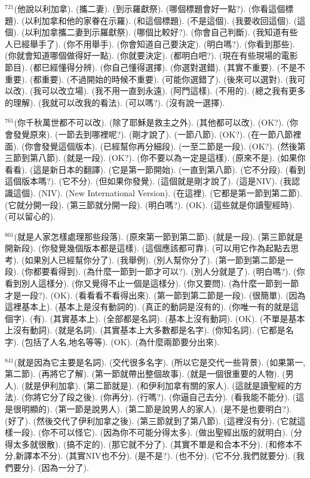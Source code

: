 \documentclass{book}
\begin{document}
$^{721}$(他說以利加拿).
(攜二妻).
(到示羅獻祭).
(哪個標題會好一點?).
(你看這個標題).
(以利加拿和他的家眷在示羅).
(和這個標題).
(不是這個).
(我要收回這個).
(這個).
(以利加拿攜二妻到示羅獻祭).
(哪個比較好?).
(你會自己判斷).
(我知道有些人已經舉手了).
(你不用舉手).
(你會知道自己要決定).
(明白嗎?).
(你看到那些).
(你就會知道哪個做得好一點).
(你就要決定).
(都明白吧?).
(現在有些現場的電影節目).
(都已經懂得分辨).
(你自己懂得選擇).
(你選對選錯).
(其實不重要).
(不是不重要).
(都重要).
(不過開始的時候不重要).
(可能你選錯了).
(後來可以選對).
(我可以改).
(我可以改立場).
(我不用一直到永遠).
(阿門這樣).
(不用的).
(總之我有更多的理解).
(我就可以改我的看法).
(可以嗎?).
(沒有說一選擇).

$^{761}$(你千秋萬世都不可以改).
(除了耶穌是救主之外).
(其他都可以改).
(OK?).
(你會發覺原來).
(一節去到哪裡呢?).
(剛才說了).
(一節八節).
(OK?).
(在一節八節裡面).
(你會發覺這個版本).
(已經幫你再分細段).
(一至二節是一段).
(OK?).
(然後第三節到第八節).
(就是一段).
(OK?).
(你不要以為一定是這樣).
(原來不是).
(如果你看看).
(這是新日本的翻譯).
(它是第一節開始).
(一直到第八節).
(它不分段).
(看到這個版本嗎?).
(它不分).
(但如果你發覺).
(這個就是剛才說了).
(這是NIV).
(我認識這個).
(NIV).
(New International Version).
(在這裡).
(它都是第一節到第二節).
(它就分開一段).
(第三節就分開一段).
(明白嗎?).
(OK).
(這些就是你讀聖經時).
(可以留心的).

$^{801}$(就是人家怎樣處理那些段落).
(原來第一節到第二節).
(就是一段).
(第三節就是開新段).
(你發覺幾個版本都是這樣).
(這個應該都可靠).
(可以用它作為起點去思考).
(如果別人已經幫你分了).
(我舉例).
(別人幫你分了).
(第一節到第二節是一段).
(你都要看得到).
(為什麼一節到一節才可以?).
(別人分就是了).
(明白嗎?).
(你看到別人這樣分).
(你又覺得不止一個是這樣分).
(你又要問).
(為什麼一節到一節才是一段?).
(OK).
(看看看不看得出來).
(第一節到第二節是一段).
(很簡單).
(因為這裡基本上).
(基本上是沒有動詞的).
(真正的動詞是沒有的).
(你唯一有的就是這個字).
(有).
(其實基本上).
(全部都是名詞).
(基本上沒有動詞).
(OK).
(不單是基本上沒有動詞).
(就是名詞).
(其實基本上大多數都是名字).
(你知名詞).
(它都是名字).
(包括了人名,地名等等).
(OK).
(為什麼兩節要分出來).

$^{841}$(就是因為它主要是名詞).
(交代很多名字).
(所以它是交代一些背景).
(如果第一,第二節).
(再將它了解).
(第一節就帶出整個故事).
(就是一個很重要的人物).
(男人).
(就是伊利加拿).
(第二節就是).
(和伊利加拿有關的家人).
(這就是讀聖經的方法).
(你將它分了段之後).
(你再分).
(行嗎?).
(你逼自己去分).
(看我能不能分).
(這是很明顯的).
(第一節是說男人).
(第二節是說男人的家人).
(是不是也要明白?).
(好了).
(然後交代了伊利加拿之後).
(第三節就到了第八節).
(這裡沒有分).
(它就這樣一段).
(你不可以怪它).
(因為你不可能分得太多).
(做出聖經出版的就明白).
(分得太多就很散).
(搞不定的).
(那它就不分了).
(其實不單是和合本不分).
(和修本不分,新譯本不分).
(其實NIV也不分).
(是不是?).
(也不分).
(它不分,我們就要分).
(我們要分).
(因為一分了).
\end{document}
